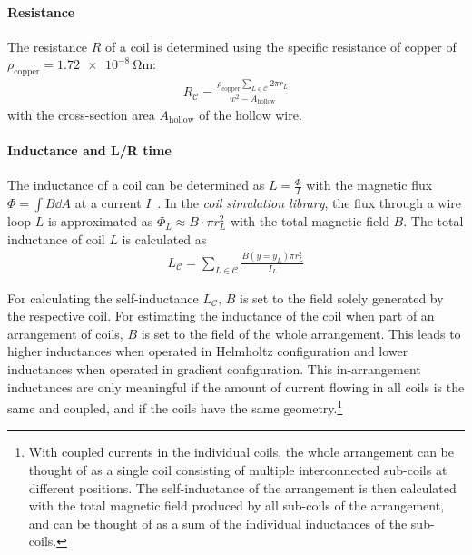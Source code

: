\paragraph{Resistance}
The resistance $R$ of a coil is determined using the specific resistance of copper of $\rho_\text{copper} = \SI{1.72e-8}{\ohm\meter}$:
\begin{align}\label{eq:resistance_simulation}
    R_\mathcal{C} = \frac{\rho_\text{copper} \sum\limits_{L \in \mathcal{C}} 2\pi r_L} {w^2 - A_\text{hollow}}
\end{align}
with the cross-section area $A_\text{hollow}$ of the hollow wire.

\paragraph{Inductance and L/R time} The inductance of a coil can be determined as $L = \frac{\Phi}{I}$ with the magnetic flux $\Phi = \int B \dd A$ at a current $I$~\cite{demtroder_zeitlich_2013}. In the \textit{coil simulation library}, the flux through a wire loop $L$ is approximated as $\Phi_L \approx B \cdot \pi r_L^2$ with the total magnetic field $B$. The total inductance of coil $L$ is calculated as
\begin{align}\label{eq:inductance_simulation}
    L_\mathcal{C} = \sum\limits_{L \in \mathcal{C}} \frac{B(y = y_L) \pi r_L^2}{I_L}
\end{align}

For calculating the self-inductance $L_\mathcal{C}$, $B$ is set to the field solely generated by the respective coil. For estimating the inductance of the coil when part of an arrangement of coils, $B$ is set to the field of the whole arrangement. This leads to higher inductances when operated in Helmholtz configuration and lower inductances when operated in gradient configuration. This in-arrangement inductances are only meaningful if the amount of current flowing in all coils is the same and coupled, and if the coils have the same geometry.\footnote{With coupled currents in the individual coils, the whole arrangement can be thought of as a single coil consisting of multiple interconnected sub-coils at different positions. The self-inductance of the arrangement is then calculated with the total magnetic field produced by all sub-coils of the arrangement, and can be thought of as a sum of the individual inductances of the sub-coils.}

